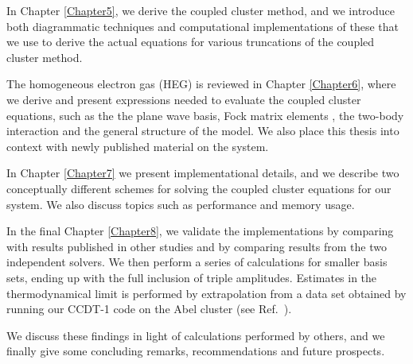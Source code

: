 In Chapter \ref{Chapter5}, we derive the coupled cluster method, and we introduce both diagrammatic techniques and computational implementations of these that we use to derive the actual equations for various truncations of the coupled cluster method.

The homogeneous electron gas (HEG) is reviewed in Chapter \ref{Chapter6}, where we derive and present expressions needed to evaluate the coupled cluster equations, such as the the plane wave basis, Fock matrix elements \cite{Thijssen}, the two-body interaction \cite{ShavittBartlett2009} and the general structure of the model. We also place this thesis into context with newly published material on the system.

In Chapter \ref{Chapter7} we present implementational details, and we describe two conceptually different schemes for solving the coupled cluster equations for our system. We also discuss topics such as performance and memory usage.

In the final Chapter \ref{Chapter8}, we validate the implementations by comparing with results published in other studies and by comparing results from the two independent solvers. We then perform a series of calculations for smaller basis sets, ending up with the full inclusion of triple amplitudes. Estimates in the thermodynamical limit is performed by extrapolation from a data set obtained by running our CCDT-1 code on the Abel cluster (see Ref.~\cite{abel}).

We discuss these findings in light of calculations performed by others, and we finally give some concluding remarks, recommendations and future prospects.












